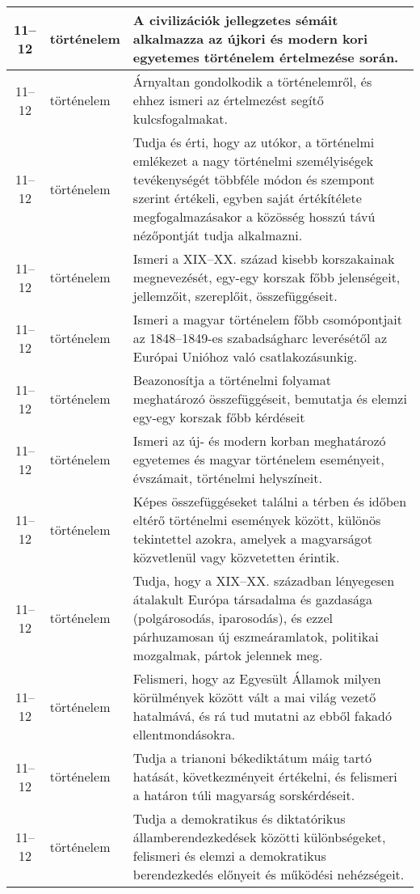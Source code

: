 \begin{small}
\begin{longtable}{c | p{2cm} |  p{11cm} }
              11--12 & történelem & A civilizációk jellegzetes sémáit alkalmazza az újkori és modern kori egyetemes történelem értelmezése során. \\ \hline
              11--12 & történelem & Árnyaltan gondolkodik a történelemről, és ehhez ismeri az értelmezést segítő kulcsfogalmakat. \\ \hline
              11--12 & történelem & Tudja és érti, hogy az utókor, a történelmi emlékezet a nagy történelmi személyiségek tevékenységét többféle módon és szempont szerint értékeli, egyben saját értékítélete megfogalmazásakor a közösség hosszú távú nézőpontját tudja alkalmazni. \\ \hline
              11--12 & történelem & Ismeri a XIX--XX. század kisebb korszakainak megnevezését, egy-egy korszak főbb jelenségeit, jellemzőit, szereplőit, összefüggéseit. \\ \hline
              11--12 & történelem & Ismeri a magyar történelem főbb csomópontjait az 1848--1849-es szabadságharc leverésétől az Európai Unióhoz való csatlakozásunkig. \\ \hline
              11--12 & történelem & Beazonosítja a történelmi folyamat meghatározó összefüggéseit, bemutatja és elemzi egy-egy korszak főbb kérdéseit \\ \hline
              11--12 & történelem & Ismeri az új- és modern korban meghatározó egyetemes és magyar történelem eseményeit, évszámait, történelmi helyszíneit. \\ \hline
              11--12 & történelem & Képes összefüggéseket találni a térben és időben eltérő történelmi események között, különös tekintettel azokra, amelyek a magyarságot közvetlenül vagy közvetetten érintik. \\ \hline
              11--12 & történelem & Tudja, hogy a XIX–XX. században lényegesen átalakult Európa társadalma és gazdasága (polgárosodás, iparosodás), és ezzel párhuzamosan új eszmeáramlatok, politikai mozgalmak, pártok jelennek meg. \\ \hline
              11--12 & történelem & Felismeri, hogy az Egyesült Államok milyen körülmények között vált a mai világ vezető hatalmává, és rá tud mutatni az ebből fakadó ellentmondásokra. \\ \hline
              11--12 & történelem & Tudja a trianoni békediktátum máig tartó hatását, következményeit értékelni, és felismeri a határon túli magyarság sorskérdéseit. \\ \hline
              11--12 & történelem & Tudja a demokratikus és diktatórikus államberendezkedések közötti különbségeket, felismeri és elemzi a demokratikus berendezkedés előnyeit és működési nehézségeit. \\ \hline

\end{longtable}
\end{small}
